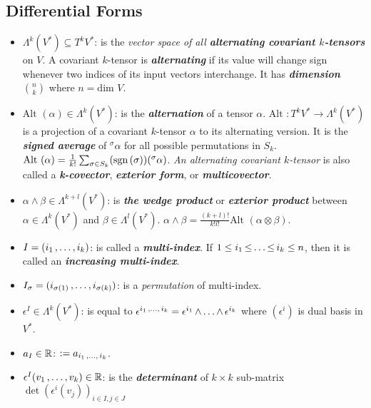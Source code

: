 \documentclass[11pt]{article}
\begin{document}
\subsection{Differential Forms} 
\begin{itemize}
\item $\Lambda^{k}(V^{*}) \subseteq T^{k}V^{*}$: \quad is the \emph{vector space of all \textbf{alternating covariant $k$-tensors}} on $V$. A covariant $k$-tensor is \emph{\textbf{alternating}} if its value will change sign whenever two indices of its input vectors interchange. It has \emph{\textbf{dimension}} $n \choose k$ where $n = \text{dim }V$.

\item $\text{Alt }(\alpha) \in \Lambda^{k}(V^{*})$: \quad is the \emph{\textbf{alternation}} of a tensor $\alpha$. $\text{Alt }: T^{k}V^{*} \rightarrow \Lambda^{k}(V^{*})$ is a projection of a covariant $k$-tensor $\alpha$ to its alternating version. It is the \emph{\textbf{signed average}} of ${^\sigma \alpha}$ for all possible permutations in $S_k$. $\text{Alt }(\alpha) = \frac{1}{k!}\sum_{\sigma \in S_k}(\text{sgn}\left(\sigma\right))({^\sigma \alpha})$. \emph{An alternating covariant $k$-tensor} is also called a \emph{\textbf{k-covector}}, \emph{\textbf{exterior form}}, or \emph{\textbf{multicovector}}.

\item $\alpha \wedge \beta \in \Lambda^{k+l}(V^{*})$: \quad is \emph{\textbf{the wedge product}} or \emph{\textbf{exterior product}} between $\alpha \in \Lambda^{k}(V^{*})$ and $\beta \in \Lambda^{l}(V^{*})$. $\alpha \wedge \beta = \frac{(k+l)!}{k! l!}\text{Alt }(\alpha \otimes \beta)$.

\item $I = (i_1 \,{,}\ldots{,}\, i_k)$: \quad is called a \emph{\textbf{multi-index}}. If $1 \le i_1 \,{\le}\ldots{\le}\, i_k \le n$, then it is called an \emph{\textbf{increasing multi-index}}.

\item $I_{\sigma} = (i_{\sigma(1)} \,{,}\ldots{,}\, i_{\sigma(k)})$: \quad is a \emph{permutation} of multi-index.

\item $\epsilon^{I} \in \Lambda^{k}(V^{*})$: \quad is equal to $\epsilon^{i_1 \,{,}\ldots{,}\, i_k} = \epsilon^{i_1} \,{\wedge}\ldots{\wedge}\, \epsilon^{i_k}$ where $(\epsilon^i)$ is dual basis in $V^{*}$. 

\item $a_{I} \in {\mathbb R}$: \quad $:= a_{i_1 \,{,}\ldots{,}\, i_k}$.

\item $\epsilon^{I}(v_1 \,{,}\ldots{,}\, v_k) \in {\mathbb R}$: \quad is the \emph{\textbf{determinant}} of $k\times k$ sub-matrix $\det(\epsilon^{i}(v_j))_{i\in I, j \in J}$


\end{itemize}
\end{document}
